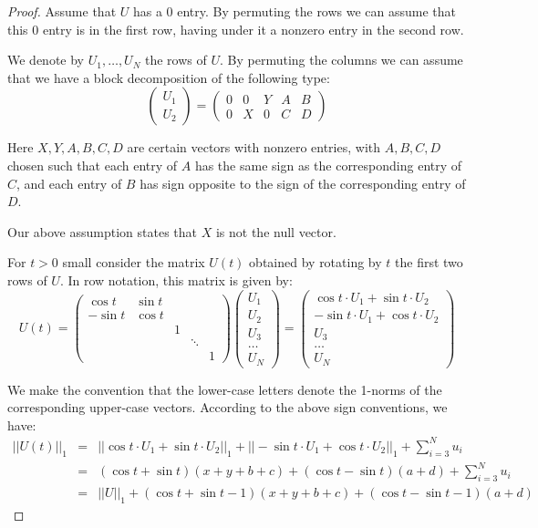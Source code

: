 \documentclass[12pt]{amsart}
\begin{document}
\begin{proof}
Assume that $U$ has a 0 entry. By permuting the rows we can assume that this 0 entry is in the first row, having under it a nonzero entry in the second row.

We denote by $U_1,\ldots,U_N$ the rows of $U$. By permuting the columns we can assume that we have a block decomposition of the following type:
$$\begin{pmatrix}U_1\\ U_2\end{pmatrix}
=\begin{pmatrix}
0&0&Y&A&B\\
0&X&0&C&D
\end{pmatrix}$$

Here $X,Y,A,B,C,D$ are certain vectors with nonzero entries, with $A,B,C,D$ chosen such that each entry of $A$ has the same sign as the corresponding entry of $C$, and each entry of $B$ has sign opposite to the sign of the corresponding entry of $D$.

Our above assumption states that $X$ is not the null vector.

For $t>0$ small consider the matrix $U(t)$ obtained by rotating by $t$ the first two rows of $U$. In row notation, this matrix is given by: 
$$U(t)=\begin{pmatrix}
\cos t&\sin t\\
-\sin t&\cos t\\
&&1\\
&&&\ddots\\
&&&&1\end{pmatrix}
\begin{pmatrix}
U_1\\ U_2\\ U_3\\ \ldots\\ U_N
\end{pmatrix}
=\begin{pmatrix}
\cos t\cdot U_1+\sin t\cdot U_2\\ -\sin t\cdot U_1+\cos t\cdot U_2\\ U_3\\ \ldots\\ U_N
\end{pmatrix}$$

We make the convention that the lower-case letters denote the 1-norms of the corresponding upper-case vectors. According to the above sign conventions, we have:
\begin{eqnarray*}
||U(t)||_1
&=&||\cos t\cdot U_1+\sin t\cdot U_2||_1+||-\sin t\cdot U_1+\cos t\cdot U_2||_1+\sum_{i=3}^Nu_i\\
&=&(\cos t+\sin t)(x+y+b+c)+(\cos t-\sin t)(a+d)+\sum_{i=3}^Nu_i\\
&=&||U||_1+(\cos t+\sin t-1)(x+y+b+c)+(\cos t-\sin t-1)(a+d)
\end{eqnarray*}


\end{proof}
\end{document}
